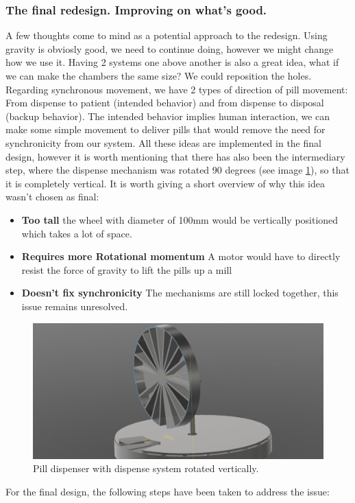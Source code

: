 \subsubsection{The final redesign. Improving on what's good.}
A few thoughts come to mind as a potential approach to the redesign. Using gravity is obviosly good, we need to continue doing, however we might change how we use it. Having 2 systems one above another is also a great idea, what if we can make the chambers the same size? We could reposition the holes. Regarding synchronous movement, we have 2 types of direction of pill movement: From dispense to patient (intended behavior) and from dispense to disposal (backup behavior). The intended behavior implies human interaction, we can make some simple movement to deliver pills that would remove the need for synchronicity from our system. All these ideas are implemented in the final design, however it is worth mentioning that there has also been the intermediary step, where the dispense mechanism was rotated 90 degrees (see image \ref{fig:screenshot4}), so that it is completely vertical. It is worth giving a short overview of why this idea wasn't chosen as final:
\begin{itemize}
	\item{\textbf{Too tall}} the wheel with diameter of 100mm would be vertically positioned which takes a lot of space.
	\item{\textbf{Requires more Rotational momentum}} A motor would have to directly resist the force of gravity to lift the pills up a mill
	\item{\textbf{Doesn't fix synchronicity}} The mechanisms are still locked together, this issue remains unresolved.
\end{itemize}
\begin{figure}[]
	\centering
	\includegraphics[width=0.6\linewidth]{Figures/Screenshot_4}
	\caption[Vertical Pillenspender.]{Pill dispenser with dispense system rotated vertically.}
	\label{fig:screenshot4}
\end{figure}
\newpage
For the final design, the following steps have been taken to address the issue:
